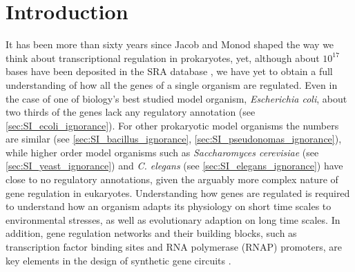 \section{Introduction}
It has been more than sixty years since Jacob and Monod \cite{jacob1961genetic} shaped the way we think about transcriptional regulation in prokaryotes, yet, although about $10^{17}$ bases have been deposited in the SRA database , we have yet to obtain a full understanding of how all the genes of a single organism are regulated. Even in the case of one of biology's best studied model organism, \textit{Escherichia coli}, about two thirds of the genes lack any regulatory annotation (see \ref{sec:SI_ecoli_ignorance}). For other prokaryotic model organisms the numbers are similar (see \ref{sec:SI_bacillus_ignorance}, \ref{sec:SI_pseudonomas_ignorance}), while higher order model organisms such as \textit{Saccharomyces cerevisiae} (see \ref{sec:SI_yeast_ignorance}) and \textit{C. elegans} (see \ref{sec:SI_elegans_ignorance}) have close to no regulatory annotations, given the arguably more complex nature of gene regulation in eukaryotes. Understanding how genes are regulated is required to understand how an organism adapts its physiology on short time scales to environmental stresses, as well as evolutionary adaption on long time scales. In addition, gene regulation networks and their building blocks, such as transcription factor binding sites and RNA polymerase (RNAP) promoters, are key elements in the design of synthetic gene circuits \cite{elowitz2000synthetic, mangan2003structure, alon2006introduction}.

